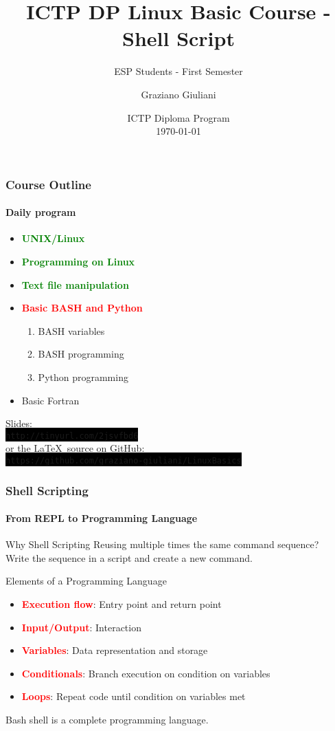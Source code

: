 \documentclass[unknownkeysallowed, 10pt, a4 paper, handout]{beamer}
\title[Linux Programming]{ICTP DP Linux Basic Course - Shell Script}
\subtitle{ESP Students - First Semester}
\author[Graziano Giuliani]{Graziano Giuliani \\ \focus{ggiulian@ictp.it}}
\institute[ICTP]{The Abdus Salam International Centre for Theoretical Physics}
\date[\today]{ICTP Diploma Program \\ \today}
\newcommand{\focus}[1]{\textbf{\textcolor{red}{#1}}}
\newcommand{\expire}[1]{\textbf{\textcolor{green}{#1}}}
\newcommand{\code}[1]{\colorbox{black}{\color{green}\texttt{#1}}}
\begin{document}
\begin{frame}
  \titlepage
\end{frame}


\begin{frame}[label=outline]
  \frametitle{Course Outline \footnotemark}
  \framesubtitle{Daily program}
  \begin{itemize}
    \item \expire{UNIX/Linux}
    \item \expire{Programming on Linux}
    \item \expire{Text file manipulation}
    \item \focus{Basic BASH and Python}
      \begin{enumerate}
        \item BASH variables
        \item BASH programming
        \item Python programming
      \end{enumerate}
    \item Basic Fortran
  \end{itemize}

  \vspace{6mm}

  Slides: \\ \code{http://tinyurl.com/2jsvfbd6}
  \vspace{4mm} \\
  or the \LaTeX \ source on GitHub: \\
  \code{https://github.com/graziano-giuliani/LinuxBasics}


\end{frame}


\begin{frame}
  \frametitle{Shell Scripting}
  \framesubtitle{From REPL to Programming Language}

  \begin{alertblock}{Why Shell Scripting}
    Reusing multiple times the same command sequence? \\
      Write the sequence in a script and create a new command.
  \end{alertblock}
  \begin{block}{Elements of a Programming Language}
    \begin{itemize}
      \item \focus{Execution flow}: Entry point and return point
      \item \focus{Input/Output}: Interaction
      \item \focus{Variables}: Data representation and storage
      \item \focus{Conditionals}: Branch execution on condition on variables
      \item \focus{Loops}: Repeat code until condition on variables met
    \end{itemize}
  \end{block}
  \begin{exampleblock}{}
    Bash shell is a complete programming language.
  \end{exampleblock}
\end{frame}
\end{document}
